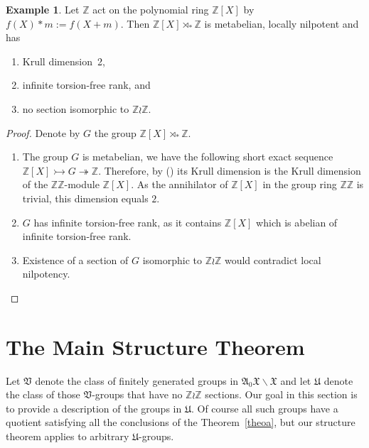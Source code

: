 \documentclass[11pt]{article}
\theoremstyle{definition}
\newtheorem{exam}[theo]{Example}
\numberwithin{equation}{section}
\numberwithin{figure}{section}
\numberwithin{table}{section}
\renewcommand{\setminus}{\smallsetminus}
\newcommand{\Z}{\mathbb{Z}}
\newcommand{\mono}{\rightarrowtail}
\newcommand{\epi}{\twoheadrightarrow}
\newcommand*{\romanenumi}{\renewcommand*{\theenumi}{\roman{enumi}}}
\begin{document}


\begin{exam}\label{Krull infinite tf rk and sections}
Let $\Z$ act on the polynomial ring $\Z[X]$ by $f(X)*m:=f(X+m)$. Then $\Z[X]\rtimes_*\Z$ is metabelian, locally nilpotent and has
\begin{enumerate}\romanenumi
\item \label{list2.13.1}Krull dimension~2,
\item \label{list2.13.2}infinite torsion-free rank, and
\item \label{list2.13.3}no section isomorphic to $\Z\wr\Z$.
\end{enumerate}
\end{exam}


\begin{proof}
Denote by $G$ the group $\Z[X]\rtimes_*\Z$.
\begin{enumerate}\romanenumi
\item[{\eqref{list2.13.1}}] The group $G$ is metabelian, we have the following short exact sequence $\Z[X] \mono G \epi \Z$. Therefore, by (\cite[Proposition~2.24]{J}) its Krull dimension is the Krull dimension of the $\Z\Z$-module $\Z[X]$. As the annihilator of $\Z[X]$ in the group ring $\Z\Z$ is trivial, this dimension equals $2$.
\item[{\eqref{list2.13.2}}] $G$ has infinite torsion-free rank, as it contains $\Z[X]$ which is abelian of infinite torsion-free rank.
\item[{\eqref{list2.13.3}}] Existence of a section of $G$ isomorphic to $\Z\wr\Z$ would contradict local nilpotency.\qedhere
\end{enumerate}
\end{proof}



\section{The Main Structure Theorem}\label{sect-3}

Let $\mathfrak V$ denote the class of finitely generated groups in $\mathfrak A_0\mathfrak X\setminus\mathfrak X$ and let $\mathfrak U$ denote the class of those $\mathfrak V$-groups that have no $\Z\wr\Z$ sections. Our goal in this section is to provide a description of the groups in $\mathfrak U$. Of course all such groups have a quotient satisfying all the conclusions of the Theorem~\ref{theoa}, but our structure theorem applies to arbitrary $\mathfrak U$-groups.
\end{document}
